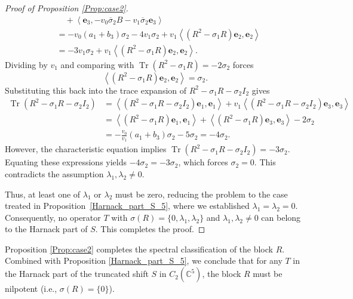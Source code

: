 \documentclass[12pt, reqno]{amsart}
\theoremstyle{definition}
\theoremstyle{remark}
\numberwithin{equation}{section}
\begin{document}
\begin{proof}[Proof of Proposition \ref{Prop:case2}]
\begin{align*}
		&\quad + \left\langle \mathbf{e}_3, -v_0 \overline{\sigma}_2 B - v_1 \overline{\sigma}_2 \mathbf{e}_3 \right\rangle \\
		&= -v_0(a_1+b_3)\sigma_2 - 4v_1 \sigma_2 + v_1\left\langle (R^2 - \sigma_1 R)\mathbf{e}_2, \mathbf{e}_2 \right\rangle \\
		&= -3v_1 \sigma_2 + v_1\left\langle (R^2 - \sigma_1 R)\mathbf{e}_2, \mathbf{e}_2 \right\rangle.
	\end{align*}
	Dividing by $v_1$ and comparing with $\operatorname{Tr}(R^2 - \sigma_1 R) = -2\sigma_2$ forces
	\[
	\left\langle (R^2 - \sigma_1 R)\mathbf{e}_2, \mathbf{e}_2 \right\rangle = \sigma_2.
	\]
	Substituting this back into the trace expansion of $R^2 - \sigma_1 R - \sigma_2 I_2$ gives
\begin{align*}
		\operatorname{Tr}(R^2 - \sigma_1 R - \sigma_2 I_2) &= \left\langle (R^2 - \sigma_1 R - \sigma_2 I_2) \mathbf{e}_1, \mathbf{e}_1 \right\rangle + v_1\left\langle(R^2 - \sigma_1 R - \sigma_2 I_2)\mathbf{e}_3, \mathbf{e}_3\right\rangle \\
		&=\left\langle (R^2 - \sigma_1 R)   \mathbf{e}_1, \mathbf{e}_1 \right\rangle + \left\langle(R^2 - \sigma_1 R)\mathbf{e}_3, \mathbf{e}_3\right\rangle-2 \sigma_2 \\
		&=-\frac{v_0}{v_1}(a_1+b_3)\sigma_2 - 5\sigma_2 = -4\sigma_2.
\end{align*}
	However, the characteristic equation implies $\operatorname{Tr}(R^2 - \sigma_1 R - \sigma_2 I_2) = -3\sigma_2$. Equating these expressions yields $-4\sigma_2 = -3\sigma_2$, which forces $\sigma_2 = 0$. This contradicts the assumption $\lambda_1, \lambda_2 \neq 0$. 
	
	Thus, at least one of $\lambda_1$ or $\lambda_2$ must be zero, reducing the problem to the case treated in Proposition~\ref{Harnack_part_S_5}, where we established $\lambda_1 = \lambda_2 = 0$. Consequently, no operator $T$ with $\sigma(R)=\{0, \lambda_1, \lambda_2\}$ and $\lambda_1, \lambda_2 \neq 0$ can belong to the Harnack part of $S$. This completes the proof.
\end{proof}

Proposition \ref{Prop:case2} completes the spectral classification of the block $R$. Combined with Proposition \ref{Harnack_part_S_5}, we conclude that for any $T$ in the Harnack part of the truncated shift $S$ in $C_2(\mathbb{C}^{5})$, the block $R$ must be nilpotent (i.e., $\sigma(R)=\{0\}$).

\medskip
\end{document}
